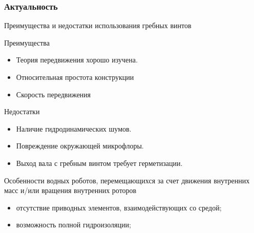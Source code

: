 \begin{frame}
\frametitle{Актуальность}
	
	Преимущества и недостатки использования гребных винтов
	\begin{minipage}[t]{0.49\linewidth}
		Преимущества
		\begin{itemize}
			\item Теория передвижения хорошо изучена.
			\item Относительная простота конструкции
			\item Скорость передвижения
		\end{itemize}
	\end{minipage}
	\hfill
	\begin{minipage}[t]{0.49\linewidth}
		Недостатки
		\begin{itemize}
			\item Наличие гидродинамических шумов.
			\item Повреждение окружающей микрофлоры.
			\item Выход вала с гребным винтом требует герметизации.
		\end{itemize}
	\end{minipage}

	\vspace{2mm}
	
	Особенности водных роботов, перемещающихся за счет движения внутренних масс и/или вращения внутренних роторов%
		\begin{itemize}
			\item отсутствие приводных элементов, взаимодействующих со средой;
			\item возможность полной гидроизоляции;
		\end{itemize}
		



\end{frame}

